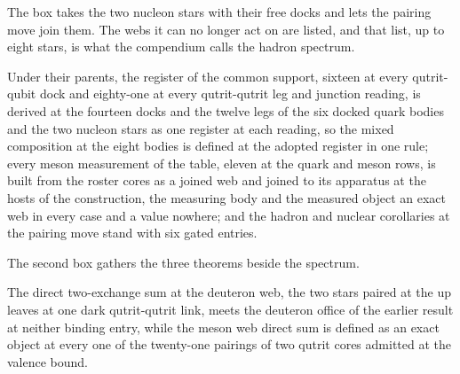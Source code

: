 The box takes the two nucleon stars with their free docks and lets the pairing move join them. The webs it can no longer act on are listed, and that list, up to eight stars, is what the compendium calls the hadron spectrum.
\begin{chconditional}\label{box:VII-6-hadron-spectrum-and-the-mesons:2}
Under their parents, the register of the common support, sixteen at every qutrit-qubit dock and eighty-one at every qutrit-qutrit leg and junction reading, is derived at the fourteen docks and the twelve legs of the six docked quark bodies and the two nucleon stars as one register at each reading, so the mixed composition at the eight bodies is defined at the adopted register in one rule; every meson measurement of the table, eleven at the quark and meson rows, is built from the roster cores as a joined web and joined to its apparatus at the hosts of the construction, the measuring body and the measured object an exact web in every case and a value nowhere; and the hadron and nuclear corollaries at the pairing move stand with six gated entries.
\end{chconditional}
The second box gathers the three theorems beside the spectrum.
\begin{chwall}\label{box:VII-6-hadron-spectrum-and-the-mesons:3}
The direct two-exchange sum at the deuteron web, the two stars paired at the up leaves at one dark qutrit-qutrit link, meets the deuteron office of the earlier result at neither binding entry, while the meson web direct sum is defined as an exact object at every one of the twenty-one pairings of two qutrit cores admitted at the valence bound.
\end{chwall}
